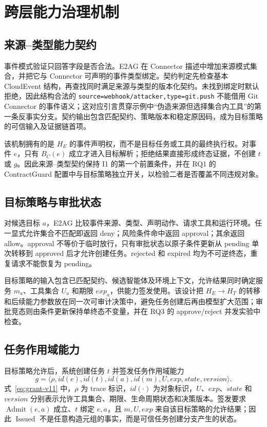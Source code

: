 \section{跨层能力治理机制}\label{sec:method-v11}

\subsection{来源--类型能力契约}

事件模式验证只回答字段是否合法。E2AG 在 Connector 描述中增加来源模式集合，并把它与 Connector 可声明的事件类型绑定。契约判定先检查基本 CloudEvent 结构，再查找同时满足来源与类型的版本化契约。未找到绑定时默认拒绝，因此结构合法的 \texttt{source=webhook/attacker,type=git.push} 不能借用 Git Connector 的事件语义；这对应引言贯穿示例中“伪造来源但选择集合内工具”的第一条反事实分支。契约输出包含匹配契约、策略版本和稳定原因码，成为目标策略的可信输入及证据链首项。

该机制拥有的是 $H_E$ 的事件声明权，而不是目标任务或工具的最终执行权。对事件 $e$，只有 $B_C(e)$ 成立才进入目标解析；拒绝结果直接形成终态证据，不创建 $t$ 或 $g$。因此来源--类型契约保持 I1 的第一个前置条件，并在 RQ1 的 ContractGuard 配置中与目标策略独立开关，以检验二者是否覆盖不同违规对象。

\subsection{目标策略与审批状态}

对候选目标 $a$，E2AG 比较事件来源、类型、声明动作、请求工具和运行环境。任一显式允许集合不匹配即返回 deny；风险条件命中返回 approval；其余返回 allow。approval 不等价于临时放行，只有审批状态以原子条件更新从 pending 单次转移到 approved 后才允许创建任务。rejected 和 expired 均为不可逆终态，重复请求不能恢复为 pending。

目标策略的输入包含已匹配契约、候选智能体及环境上下文，允许结果同时确定服务 $m_a$、工具集合 $U_a$ 和期限 $exp_a$，供能力签发使用。该设计把 $H_E\rightarrow H_T$ 的转移和后续能力参数放在同一次可审计决策中，避免任务创建后再由模型扩大范围；审批竞态则由条件更新保持单终态不变量，并在 RQ3 的 approve/reject 并发实验中检查。

\subsection{任务作用域能力}

目标策略允许后，系统创建任务 $t$ 并签发任务作用域能力
\begin{equation}
g=\langle \rho,id(e),id(t),id(a),id(m),U,exp,state,version\rangle.
\label{eq:grant-v11}
\end{equation}
式~\eqref{eq:grant-v11} 中，$\rho$ 为 trace 标识，$id(\cdot)$ 为对象标识，$U$、$exp$、$state$ 和 $version$ 分别表示允许工具集合、期限、生命周期状态和决策版本。签发要求 $\operatorname{Admit}(e,a)$ 成立、$t$ 绑定 $e,a$，且 $m,U,exp$ 来自该目标策略的允许结果；因此 $\operatorname{Issued}$ 不是任意构造元组的事实，而是可信任务创建分支产生的状态。

